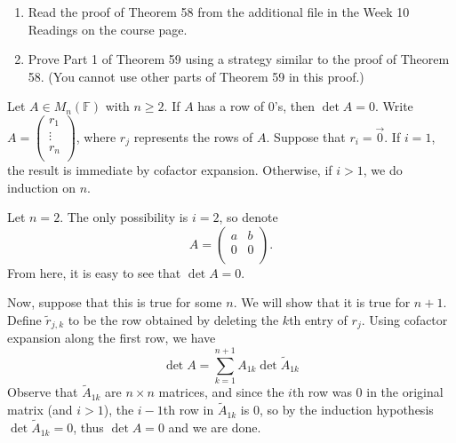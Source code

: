 \documentclass{eh-homework}
\begin{document}
    \newpage
    \begin{question}{3}
    \begin{enumerate}[label=(\alph*)]
        \item Read the proof of Theorem 58 from the additional file in the Week 10 Readings on the course page.
        \item Prove Part 1 of Theorem 59 using a strategy similar to the proof of Theorem 58. (You cannot use other parts of Theorem 59 in this proof.)
    \end{enumerate}
    Let \(A \in M_n(\mathbb{F})\) with \(n \geq 2\). If \(A\) has a row of 0's, then \(\det A = 0\).
    \tcblower
    Write \(A = \begin{pmatrix}
         r_1 \\
         \vdots \\
         r_n \\
    \end{pmatrix}\), where \(r_j\) represents the rows of \(A\). Suppose that \(r_i = \vec{0}\). If \(i = 1\), the result is immediate by cofactor expansion. Otherwise, if \(i > 1\), we do induction on \(n\).

    Let \(n = 2\). The only possibility is \(i = 2\), so denote
    \[
        A = \begin{pmatrix}
            a &  b \\
            0 &  0 \\
        \end{pmatrix}.
    \]
    From here, it is easy to see that \(\det A = 0\).

    Now, suppose that this is true for some \(n\). We will show that it is true for \(n + 1\). Define \(\tilde{r}_{j,k}\) to be the row obtained by deleting the \(k\)th entry of \(r_j\). Using cofactor expansion along the first row, we have
    \[
        \det A = \sum_{k=1}^{n+1} A_{1k}\det \tilde{A}_{1k}
    \]
    Observe that \(\tilde{A}_{1k}\) are \(n\times n\) matrices, and since the \(i\)th row was 0 in the original matrix (and \(i > 1\)), the \(i - 1\)th row in \(\tilde{A}_{1k}\) is 0, so by the induction hypothesis \(\det \tilde{A}_{1k} = 0\), thus \(\det A = 0\) and we are done.

    \end{question}
    \newpage
\end{document}
